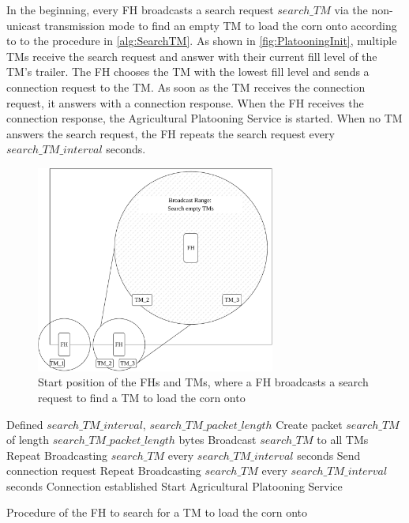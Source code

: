 In the beginning, every \ac{FH} broadcasts a search request $search\_TM$ via the non-unicast transmission mode to find an empty \ac{TM} to load the corn onto according to
to the procedure in \autoref{alg:SearchTM}.
As shown in \autoref{fig:PlatooningInit}, multiple \ac{TM}s receive the search request and answer with
their current fill level of the \ac{TM}'s trailer.
The \ac{FH} chooses the \ac{TM} with the lowest fill level and sends a connection request to the \ac{TM}.
As soon as the \ac{TM} receives the connection request, it answers with a connection response.
When the \ac{FH} receives the connection response, the Agricultural Platooning Service is started.
When no \ac{TM} answers the search request, the \ac{FH} repeats the search request every $search\_TM\_interval$ seconds.

\begin{figure}[H]%
   \centering
   \includegraphics[width=0.7\textwidth]{figures/platoonINIT}
   \caption{Start position of the \acf{FH}s and \acf{TM}s, where a \ac{FH} broadcasts a search request to find
   a \ac{TM} to load the corn onto}
   \label{fig:PlatooningInit}%
\end{figure}

\begin{algorithm}
\begin{algorithmic}[1]
\REQUIRE Defined $search\_TM\_interval$, $search\_TM\_packet\_length$
\STATE Create packet $search\_TM$ of length $search\_TM\_packet\_length$ bytes
\STATE Broadcast $search\_TM$ to all \acs{TM}s
    \STATE Repeat Broadcasting $search\_TM$ every $search\_TM\_interval$ seconds
\ELSE
   \STATE Send connection request
      \STATE Repeat Broadcasting $search\_TM$ every $search\_TM\_interval$ seconds
   \ELSE
      \STATE Connection established
      \STATE Start Agricultural Platooning Service
   \ENDIF
\ENDIF
\end{algorithmic}
\caption{Procedure of the \acf{FH} to search for a \acf{TM} to load the corn onto}
\label{alg:SearchTM}
\end{algorithm}

